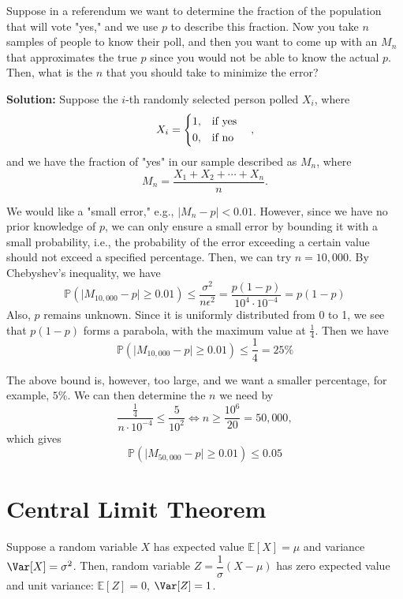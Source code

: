 \begin{eg}
    Suppose in a referendum we want to determine the fraction of the population that will vote "yes," and we use \( p \) to describe this fraction. Now you take \( n \) samples of people to know their poll, and then you want to come up with an \( M_n \) that approximates the true \( p \) since you would not be able to know the actual \( p \). Then, what is the \( n \) that you should take to minimize the error?

    \textbf{Solution:} 
    Suppose the \(i\)-th randomly selected person polled \(X_i\), where  
    \[  
        X_i = \begin{dcases}  
            1, & \text{if yes} \\  
            0, & \text{if no}  
        \end{dcases} \quad,  
    \]  
    and we have the fraction of "yes" in our sample described as \(M_n\), where  
    \[  
        M_n = \dfrac{X_1 + X_2 + \cdots + X_n}{n}.  
    \]
    
    We would like a "small error," e.g., \(\vert M_n - p \vert < 0.01\). However, since we have no prior knowledge of \(p\), we can only ensure a small error by bounding it with a small probability, i.e., the probability of the error exceeding a certain value should not exceed a specified percentage. Then, we can try \(n = 10,000\). By Chebyshev's inequality, we have
    \[
        \mathbb{P}(\vert M_{10,000} - p \vert \geq 0.01) \leq \dfrac{\sigma^2}{n\epsilon^2} = \dfrac{p(1 - p)}{10^4 \cdot 10^{-4}} = p(1 - p)
    \] 
    Also, \(p\) remains unknown. Since it is uniformly distributed from 0 to 1, we see that \(p(1 - p)\) forms a parabola, with the maximum value at \(\frac{1}{4}\). Then we have
    \[
        \mathbb{P}(\vert M_{10,000} - p \vert \geq 0.01) \leq \dfrac{1}{4} = 25\%
    \]

    The above bound is, however, too large, and we want a smaller percentage, for example, \(5\%\). We can then determine the \(n\) we need by
    \[
        \dfrac{\frac{1}{4}}{n \cdot 10^{-4}} \leq \dfrac{5}{10^2} \Longleftrightarrow n \geq \dfrac{10^6}{20} = 50,000,
    \]
    which gives 
    \[
        \mathbb{P}(\vert M_{50,000} - p \vert \geq 0.01) \leq 0.05
    \]
\end{eg}

\section{Central Limit Theorem}
Suppose a random variable \(X\) has expected value \(\mathbb{E}[X] = \mu\) and variance \(\Var[X] = \sigma^2\). Then, random variable \(Z = \dfrac{1}{\sigma} (X - \mu)\) has zero expected value and unit variance: \(\mathbb{E}[Z] = 0\), \(\Var[Z] = 1\). 

